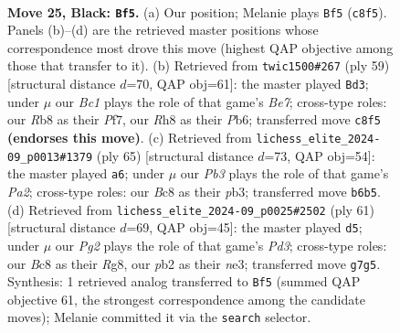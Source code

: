 \documentclass[11pt]{article}
\begin{document}
\clearpage

\begin{figure}[p]\centering
\begin{subfigure}{0.46\textwidth}\centering
\resizebox{\linewidth}{!}{%
\newchessgame
\chessboard[
  setfen={1rb4r/4k1pp/1p6/p7/3Q3P/8/PP3PP1/RN4K1 b - - 0 25},
  showmover=false,
  pgfstyle=straightmove, color=movearrow, markmove={c8-f5}
]}
\caption{}
\end{subfigure}\hfill
\begin{subfigure}{0.46\textwidth}\centering
\resizebox{\linewidth}{!}{%
\newchessgame
\chessboard[
  setfen={5r1k/5p1p/pp2rp2/8/P6Q/1P5P/4bPP1/2R3K1 b - - 2 30},
  showmover=false,
  pgfstyle=straightmove, color=movearrow, markmove={e2-d3}
]}
\caption{}
\end{subfigure}
\\[4pt]
\begin{subfigure}{0.46\textwidth}\centering
\resizebox{\linewidth}{!}{%
\newchessgame
\chessboard[
  setfen={4r2k/p5p1/4r2p/8/3Q3P/1P4P1/P4PK1/8 b - - 4 33},
  showmover=false,
  pgfstyle=straightmove, color=movearrow, markmove={a7-a6}
]}
\caption{}
\end{subfigure}\hfill
\begin{subfigure}{0.46\textwidth}\centering
\resizebox{\linewidth}{!}{%
\newchessgame
\chessboard[
  setfen={3r2r1/p4p2/3pk2p/6p1/3Q4/4N3/1PP2P1P/1K6 b - - 3 31},
  showmover=false,
  pgfstyle=straightmove, color=movearrow, markmove={d6-d5}
]}
\caption{}
\end{subfigure}
\caption{\textbf{Move 25, Black: \texttt{Bf5}.} (a) Our position; Melanie plays \texttt{Bf5} (\texttt{c8f5}). Panels (b)--(d) are the retrieved master positions whose correspondence most drove this move (highest QAP objective among those that transfer to it). (b) Retrieved from \texttt{twic1500\#267} (ply 59) [structural distance $d$=70, QAP obj=61]: the master played \texttt{Bd3}; under $\mu$ our \emph{Bc1} plays the role of that game's \emph{Be7}; cross-type roles: our \emph{R}b8 as their \emph{P}f7, our \emph{R}h8 as their \emph{P}b6; transferred move \texttt{c8f5} \textbf{(endorses this move)}. (c) Retrieved from \texttt{lichess\_elite\_2024-09\_p0013\#1379} (ply 65) [structural distance $d$=73, QAP obj=54]: the master played \texttt{a6}; under $\mu$ our \emph{Pb3} plays the role of that game's \emph{Pa2}; cross-type roles: our \emph{B}c8 as their \emph{p}b3; transferred move \texttt{b6b5}. (d) Retrieved from \texttt{lichess\_elite\_2024-09\_p0025\#2502} (ply 61) [structural distance $d$=69, QAP obj=45]: the master played \texttt{d5}; under $\mu$ our \emph{Pg2} plays the role of that game's \emph{Pd3}; cross-type roles: our \emph{B}c8 as their \emph{R}g8, our \emph{p}b2 as their \emph{n}e3; transferred move \texttt{g7g5}. Synthesis: 1 retrieved analog transferred to \texttt{Bf5} (summed QAP objective 61, the strongest correspondence among the candidate moves); Melanie committed it via the \texttt{search} selector.}
\label{fig:thought-m49}
\end{figure}
\end{document}
